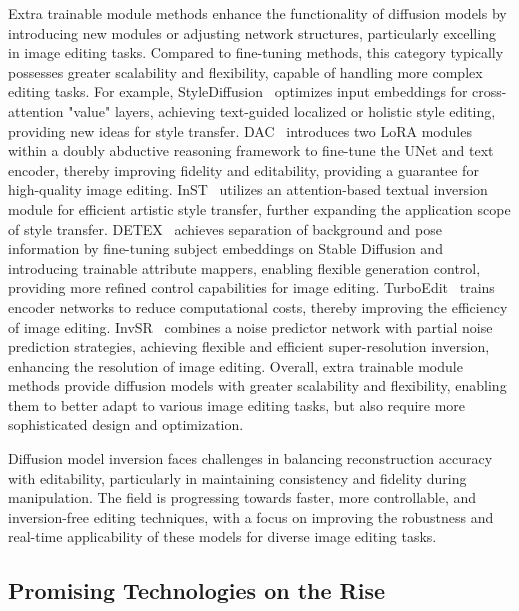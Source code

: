 Extra trainable module methods enhance the functionality of diffusion models by introducing new modules or adjusting network structures, particularly excelling in image editing tasks. Compared to fine-tuning methods, this category typically possesses greater scalability and flexibility, capable of handling more complex editing tasks. For example, StyleDiffusion~\cite{StyleDiffusion} optimizes input embeddings for cross-attention "value" layers, achieving text-guided localized or holistic style editing, providing new ideas for style transfer. DAC~\cite{DAC} introduces two LoRA modules within a doubly abductive reasoning framework to fine-tune the UNet and text encoder, thereby improving fidelity and editability, providing a guarantee for high-quality image editing. InST~\cite{InST} utilizes an attention-based textual inversion module for efficient artistic style transfer, further expanding the application scope of style transfer. DETEX~\cite{DETEX} achieves separation of background and pose information by fine-tuning subject embeddings on Stable Diffusion and introducing trainable attribute mappers, enabling flexible generation control, providing more refined control capabilities for image editing. TurboEdit~\cite{TurboEdit} trains encoder networks to reduce computational costs, thereby improving the efficiency of image editing. InvSR~\cite{InvSR} combines a noise predictor network with partial noise prediction strategies, achieving flexible and efficient super-resolution inversion, enhancing the resolution of image editing. Overall, extra trainable module methods provide diffusion models with greater scalability and flexibility, enabling them to better adapt to various image editing tasks, but also require more sophisticated design and optimization.



Diffusion model inversion faces challenges in balancing reconstruction accuracy with editability, particularly in maintaining consistency and fidelity during manipulation. The field is progressing towards faster, more controllable, and inversion-free editing techniques, with a focus on improving the robustness and real-time applicability of these models for diverse image editing tasks.


\subsection{Promising Technologies on the Rise}

